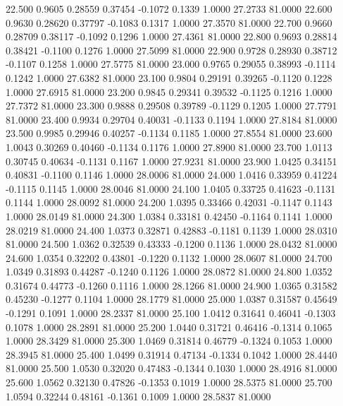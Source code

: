   22.500   0.9605   0.28559   0.37454  -0.1072   0.1339   1.0000  27.2733  81.0000
  22.600   0.9630   0.28620   0.37797  -0.1083   0.1317   1.0000  27.3570  81.0000
  22.700   0.9660   0.28709   0.38117  -0.1092   0.1296   1.0000  27.4361  81.0000
  22.800   0.9693   0.28814   0.38421  -0.1100   0.1276   1.0000  27.5099  81.0000
  22.900   0.9728   0.28930   0.38712  -0.1107   0.1258   1.0000  27.5775  81.0000
  23.000   0.9765   0.29055   0.38993  -0.1114   0.1242   1.0000  27.6382  81.0000
  23.100   0.9804   0.29191   0.39265  -0.1120   0.1228   1.0000  27.6915  81.0000
  23.200   0.9845   0.29341   0.39532  -0.1125   0.1216   1.0000  27.7372  81.0000
  23.300   0.9888   0.29508   0.39789  -0.1129   0.1205   1.0000  27.7791  81.0000
  23.400   0.9934   0.29704   0.40031  -0.1133   0.1194   1.0000  27.8184  81.0000
  23.500   0.9985   0.29946   0.40257  -0.1134   0.1185   1.0000  27.8554  81.0000
  23.600   1.0043   0.30269   0.40460  -0.1134   0.1176   1.0000  27.8900  81.0000
  23.700   1.0113   0.30745   0.40634  -0.1131   0.1167   1.0000  27.9231  81.0000
  23.900   1.0425   0.34151   0.40831  -0.1100   0.1146   1.0000  28.0006  81.0000
  24.000   1.0416   0.33959   0.41224  -0.1115   0.1145   1.0000  28.0046  81.0000
  24.100   1.0405   0.33725   0.41623  -0.1131   0.1144   1.0000  28.0092  81.0000
  24.200   1.0395   0.33466   0.42031  -0.1147   0.1143   1.0000  28.0149  81.0000
  24.300   1.0384   0.33181   0.42450  -0.1164   0.1141   1.0000  28.0219  81.0000
  24.400   1.0373   0.32871   0.42883  -0.1181   0.1139   1.0000  28.0310  81.0000
  24.500   1.0362   0.32539   0.43333  -0.1200   0.1136   1.0000  28.0432  81.0000
  24.600   1.0354   0.32202   0.43801  -0.1220   0.1132   1.0000  28.0607  81.0000
  24.700   1.0349   0.31893   0.44287  -0.1240   0.1126   1.0000  28.0872  81.0000
  24.800   1.0352   0.31674   0.44773  -0.1260   0.1116   1.0000  28.1266  81.0000
  24.900   1.0365   0.31582   0.45230  -0.1277   0.1104   1.0000  28.1779  81.0000
  25.000   1.0387   0.31587   0.45649  -0.1291   0.1091   1.0000  28.2337  81.0000
  25.100   1.0412   0.31641   0.46041  -0.1303   0.1078   1.0000  28.2891  81.0000
  25.200   1.0440   0.31721   0.46416  -0.1314   0.1065   1.0000  28.3429  81.0000
  25.300   1.0469   0.31814   0.46779  -0.1324   0.1053   1.0000  28.3945  81.0000
  25.400   1.0499   0.31914   0.47134  -0.1334   0.1042   1.0000  28.4440  81.0000
  25.500   1.0530   0.32020   0.47483  -0.1344   0.1030   1.0000  28.4916  81.0000
  25.600   1.0562   0.32130   0.47826  -0.1353   0.1019   1.0000  28.5375  81.0000
  25.700   1.0594   0.32244   0.48161  -0.1361   0.1009   1.0000  28.5837  81.0000
